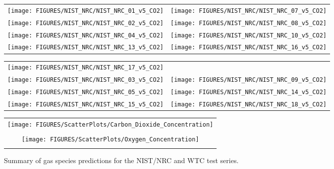 \begin{figure}[p]
\begin{tabular*}{\textwidth}{l@{\extracolsep{\fill}}r}
\texttt{[image: FIGURES/NIST\_NRC/NIST\_NRC\_01\_v5\_CO2]} &
\texttt{[image: FIGURES/NIST\_NRC/NIST\_NRC\_07\_v5\_CO2]} \\
\texttt{[image: FIGURES/NIST\_NRC/NIST\_NRC\_02\_v5\_CO2]} &
\texttt{[image: FIGURES/NIST\_NRC/NIST\_NRC\_08\_v5\_CO2]} \\
\texttt{[image: FIGURES/NIST\_NRC/NIST\_NRC\_04\_v5\_CO2]} &
\texttt{[image: FIGURES/NIST\_NRC/NIST\_NRC\_10\_v5\_CO2]} \\
\texttt{[image: FIGURES/NIST\_NRC/NIST\_NRC\_13\_v5\_CO2]} &
\texttt{[image: FIGURES/NIST\_NRC/NIST\_NRC\_16\_v5\_CO2]}
\end{tabular*}
\end{figure}

\begin{figure}[p]
\begin{tabular*}{\textwidth}{l@{\extracolsep{\fill}}r}
\texttt{[image: FIGURES/NIST\_NRC/NIST\_NRC\_17\_v5\_CO2]} &
 \\
\texttt{[image: FIGURES/NIST\_NRC/NIST\_NRC\_03\_v5\_CO2]} &
\texttt{[image: FIGURES/NIST\_NRC/NIST\_NRC\_09\_v5\_CO2]} \\
\texttt{[image: FIGURES/NIST\_NRC/NIST\_NRC\_05\_v5\_CO2]} &
\texttt{[image: FIGURES/NIST\_NRC/NIST\_NRC\_14\_v5\_CO2]} \\
\texttt{[image: FIGURES/NIST\_NRC/NIST\_NRC\_15\_v5\_CO2]} &
\texttt{[image: FIGURES/NIST\_NRC/NIST\_NRC\_18\_v5\_CO2]}
\end{tabular*}
\end{figure}


\begin{figure}[p]
\begin{center}
\begin{tabular}{c}
\texttt{[image: FIGURES/ScatterPlots/Carbon\_Dioxide\_Concentration]} \\
\vspace{0.25in} \\
\texttt{[image: FIGURES/ScatterPlots/Oxygen\_Concentration]}\\
\vspace{0.25in}
\end{tabular}
\end{center}
\caption[Summary of gas species predictions, NIST/NRC and WTC test series.]
{Summary of gas species predictions for the NIST/NRC and WTC test series.}
\end{figure}

